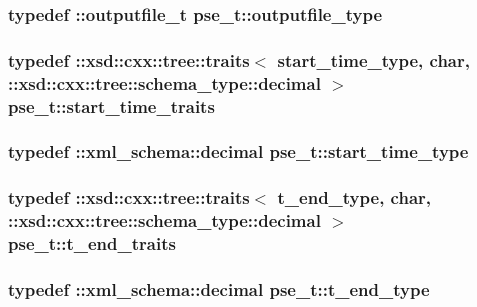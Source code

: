 \hypertarget{classpse__t_ae86d42dbfdd42a4d53733b6b11b5f875}{
\subsubsection[{outputfile\-\_\-type}]{\setlength{\rightskip}{0pt plus 5cm}typedef \-::{\bf outputfile\-\_\-t} {\bf pse\-\_\-t\-::outputfile\-\_\-type}}}\label{classpse__t_ae86d42dbfdd42a4d53733b6b11b5f875}
\hypertarget{classpse__t_ab28e5b3d2a24ea5a9b120b25dd1a27ac}{
\subsubsection[{start\-\_\-time\-\_\-traits}]{\setlength{\rightskip}{0pt plus 5cm}typedef \-::xsd\-::cxx\-::tree\-::traits$<$ {\bf start\-\_\-time\-\_\-type}, char, \-::xsd\-::cxx\-::tree\-::schema\-\_\-type\-::decimal $>$ {\bf pse\-\_\-t\-::start\-\_\-time\-\_\-traits}}}\label{classpse__t_ab28e5b3d2a24ea5a9b120b25dd1a27ac}
\hypertarget{classpse__t_a2b49c9d348499d75809e2b655582eb6f}{
\subsubsection[{start\-\_\-time\-\_\-type}]{\setlength{\rightskip}{0pt plus 5cm}typedef \-::{\bf xml\-\_\-schema\-::decimal} {\bf pse\-\_\-t\-::start\-\_\-time\-\_\-type}}}\label{classpse__t_a2b49c9d348499d75809e2b655582eb6f}
\hypertarget{classpse__t_a4de32dd1347fe5653d7b6f581929e3ba}{
\subsubsection[{t\-\_\-end\-\_\-traits}]{\setlength{\rightskip}{0pt plus 5cm}typedef \-::xsd\-::cxx\-::tree\-::traits$<$ {\bf t\-\_\-end\-\_\-type}, char, \-::xsd\-::cxx\-::tree\-::schema\-\_\-type\-::decimal $>$ {\bf pse\-\_\-t\-::t\-\_\-end\-\_\-traits}}}\label{classpse__t_a4de32dd1347fe5653d7b6f581929e3ba}
\hypertarget{classpse__t_ac4239e9fa324e53f5964848e3089fef6}{
\subsubsection[{t\-\_\-end\-\_\-type}]{\setlength{\rightskip}{0pt plus 5cm}typedef \-::{\bf xml\-\_\-schema\-::decimal} {\bf pse\-\_\-t\-::t\-\_\-end\-\_\-type}}}\label{classpse__t_ac4239e9fa324e53f5964848e3089fef6}
